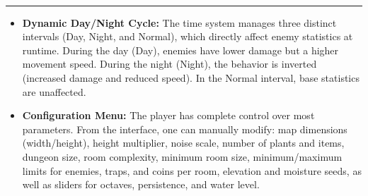 \documentclass[11pt,a4paper]{article}
\begin{document}
\vspace{0.4cm}
 \\
\rule{\textwidth}{0.8pt}
\begin{itemize}[itemsep=2pt, topsep=2pt, parsep=0pt, leftmargin=*]
    \item \textbf{Dynamic Day/Night Cycle:} The time system manages three distinct intervals (Day, Night, and Normal), which directly affect enemy statistics at runtime. During the day (Day), enemies have lower damage but a higher movement speed. During the night (Night), the behavior is inverted (increased damage and reduced speed). In the Normal interval, base statistics are unaffected.
    \item \textbf{Configuration Menu:} The player has complete control over most parameters. From the interface, one can manually modify: map dimensions (width/height), height multiplier, noise scale, number of plants and items, dungeon size, room complexity, minimum room size, minimum/maximum limits for enemies, traps, and coins per room, elevation and moisture seeds, as well as sliders for octaves, persistence, and water level.
\end{itemize}
\end{document}

